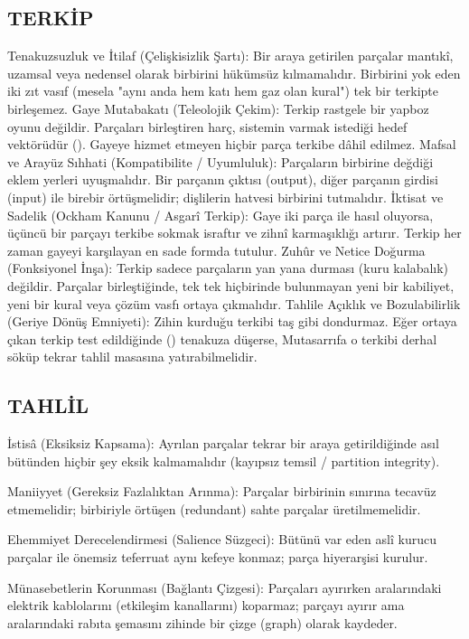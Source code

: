 \documentclass[11pt,a4paper]{article}
\begin{document}
\subsection{TERKİP}

Tenakuzsuzluk ve İtilaf (Çelişkisizlik Şartı):
Bir araya getirilen parçalar mantıkî, uzamsal veya nedensel olarak birbirini hükümsüz kılmamalıdır. Birbirini yok eden iki zıt vasıf (mesela "aynı anda hem katı hem gaz olan kural") tek bir terkipte birleşemez.
 Gaye Mutabakatı (Teleolojik Çekim):
Terkip rastgele bir yapboz oyunu değildir. Parçaları birleştiren harç, sistemin varmak istediği hedef vektörüdür (). Gayeye hizmet etmeyen hiçbir parça terkibe dâhil edilmez.
 Mafsal ve Arayüz Sıhhati (Kompatibilite / Uyumluluk):
Parçaların birbirine değdiği eklem yerleri uyuşmalıdır. Bir parçanın çıktısı (output), diğer parçanın girdisi (input) ile birebir örtüşmelidir; dişlilerin hatvesi birbirini tutmalıdır.
 İktisat ve Sadelik (Ockham Kanunu / Asgarî Terkip):
Gaye iki parça ile hasıl oluyorsa, üçüncü bir parçayı terkibe sokmak israftır ve zihnî karmaşıklığı artırır. Terkip her zaman gayeyi karşılayan en sade formda tutulur.
 Zuhûr ve Netice Doğurma (Fonksiyonel İnşa):
Terkip sadece parçaların yan yana durması (kuru kalabalık) değildir. Parçalar birleştiğinde, tek tek hiçbirinde bulunmayan yeni bir kabiliyet, yeni bir kural veya çözüm vasfı ortaya çıkmalıdır.
 Tahlile Açıklık ve Bozulabilirlik (Geriye Dönüş Emniyeti):
Zihin kurduğu terkibi taş gibi dondurmaz. Eğer ortaya çıkan terkip test edildiğinde () tenakuza düşerse, Mutasarrıfa o terkibi derhal söküp tekrar tahlil masasına yatırabilmelidir.



\subsection{TAHLİL}


İstisâ (Eksiksiz Kapsama): Ayrılan parçalar tekrar bir araya getirildiğinde asıl bütünden hiçbir şey eksik kalmamalıdır (kayıpsız temsil / partition integrity).

Maniiyyet (Gereksiz Fazlalıktan Arınma): Parçalar birbirinin sınırına tecavüz etmemelidir; birbiriyle örtüşen (redundant) sahte parçalar üretilmemelidir.


Ehemmiyet Derecelendirmesi (Salience Süzgeci): Bütünü var eden aslî kurucu parçalar ile önemsiz teferruat aynı kefeye konmaz; parça hiyerarşisi kurulur.


Münasebetlerin Korunması (Bağlantı Çizgesi): Parçaları ayırırken aralarındaki elektrik kablolarını (etkileşim kanallarını) koparmaz; parçayı ayırır ama aralarındaki rabıta şemasını zihinde bir çizge (graph) olarak kaydeder.
\end{document}
